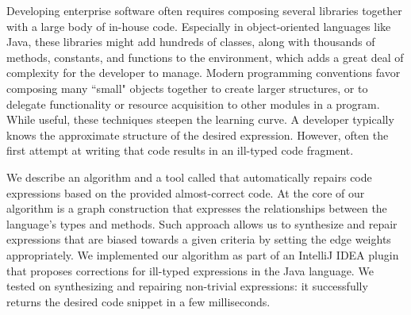 Developing enterprise software often requires composing several
libraries together with a large body of in-house code. Especially in
object-oriented languages like Java, these libraries might add
hundreds of classes, along with thousands of methods, constants, and
functions to the environment, which adds a great deal of complexity
for the developer to manage. Modern programming conventions favor
composing many ``small" objects together to create larger structures,
or to delegate functionality or resource acquisition to other modules
in a program. While useful, these techniques steepen the learning
curve. A developer typically knows the approximate structure of the
desired expression. However, often the first attempt at writing that
code results in an ill-typed code fragment.

We describe an algorithm and a tool called \ourTool that automatically
repairs code expressions based on the provided almost-correct code. At
the core of our algorithm is a graph construction that expresses the
relationships between the language's types and methods. Such approach
allows us to synthesize and repair expressions that are biased towards
a given criteria by setting the edge weights appropriately. We
implemented our algorithm as part of an IntelliJ IDEA plugin that
proposes corrections for ill-typed expressions in the Java language.
We tested \ourTool on synthesizing and repairing non-trivial expressions: 
it successfully returns the desired code snippet in a few milliseconds.


